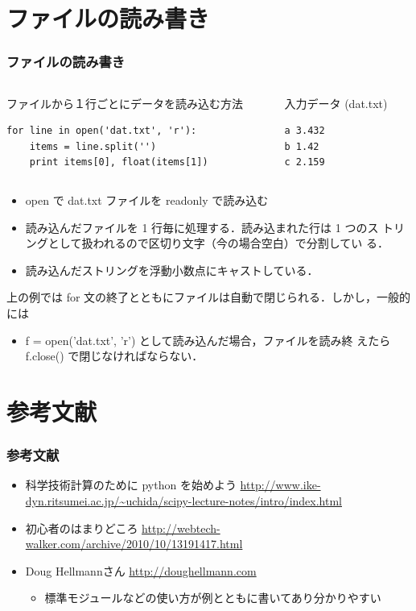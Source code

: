 \section{ファイルの読み書き}
\begin{frame}[t,fragile]
\frametitle{ファイルの読み書き}
\begin{columns}
\begin{column}{8cm}
ファイルから１行ごとにデータを読み込む方法
\begin{lstlisting}
for line in open('dat.txt', 'r'):
    items = line.split('')
    print items[0], float(items[1])
\end{lstlisting}
\end{column}
\begin{column}{4cm}
入力データ (dat.txt)
\begin{lstlisting}
a 3.432
b 1.42
c 2.159
\end{lstlisting}
\end{column}
\end{columns}

\begin{itemize}
\item open で dat.txt ファイルを readonly で読み込む
\item 読み込んだファイルを 1 行毎に処理する．読み込まれた行は 1 つのス
      トリングとして扱われるので区切り文字（今の場合空白）で分割してい
      る．
\item 読み込んだストリングを浮動小数点にキャストしている．
\end{itemize}
上の例では for 文の終了とともにファイルは自動で閉じられる．しかし，一般的には
\begin{itemize}
\item f = open('dat.txt', 'r') として読み込んだ場合，ファイルを読み終
      えたら f.close() で閉じなければならない．
\end{itemize}
\end{frame}

\section{参考文献}
\begin{frame}[t]
\frametitle{参考文献}
\begin{itemize}
\item 科学技術計算のために python を始めよう
      \url{http://www.ike-dyn.ritsumei.ac.jp/~uchida/scipy-lecture-notes/intro/index.html}
\item 初心者のはまりどころ \url{http://webtech-walker.com/archive/2010/10/13191417.html}
\item Doug Hellmannさん \url{http://doughellmann.com}
      \begin{itemize}
      \item 標準モジュールなどの使い方が例とともに書いてあり分かりやすい
      \end{itemize}
\end{itemize}

\end{frame}



